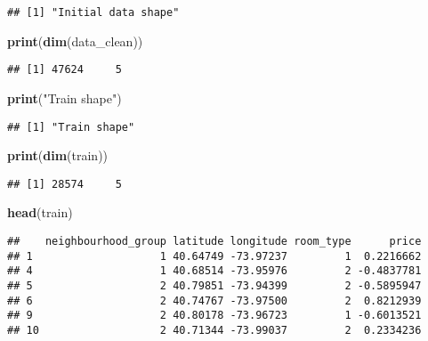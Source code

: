\documentclass[
]{article}
\newenvironment{Shaded}{\begin{snugshade}}{\end{snugshade}}
\newcommand{\KeywordTok}[1]{\textcolor[rgb]{0.13,0.29,0.53}{\textbf{#1}}}
\newcommand{\NormalTok}[1]{#1}
\newcommand{\StringTok}[1]{\textcolor[rgb]{0.31,0.60,0.02}{#1}}
\begin{document}
\begin{verbatim}
## [1] "Initial data shape"
\end{verbatim}

\begin{Shaded}
\begin{Highlighting}[]
\KeywordTok{print}\NormalTok{(}\KeywordTok{dim}\NormalTok{(data_clean))}
\end{Highlighting}
\end{Shaded}

\begin{verbatim}
## [1] 47624     5
\end{verbatim}

\begin{Shaded}
\begin{Highlighting}[]
\KeywordTok{print}\NormalTok{(}\StringTok{"Train shape"}\NormalTok{)}
\end{Highlighting}
\end{Shaded}

\begin{verbatim}
## [1] "Train shape"
\end{verbatim}

\begin{Shaded}
\begin{Highlighting}[]
\KeywordTok{print}\NormalTok{(}\KeywordTok{dim}\NormalTok{(train))}
\end{Highlighting}
\end{Shaded}

\begin{verbatim}
## [1] 28574     5
\end{verbatim}

\begin{Shaded}
\begin{Highlighting}[]
\KeywordTok{head}\NormalTok{(train)}
\end{Highlighting}
\end{Shaded}

\begin{verbatim}
##    neighbourhood_group latitude longitude room_type      price
## 1                    1 40.64749 -73.97237         1  0.2216662
## 4                    1 40.68514 -73.95976         2 -0.4837781
## 5                    2 40.79851 -73.94399         2 -0.5895947
## 6                    2 40.74767 -73.97500         2  0.8212939
## 9                    2 40.80178 -73.96723         1 -0.6013521
## 10                   2 40.71344 -73.99037         2  0.2334236
\end{verbatim}
\end{document}
